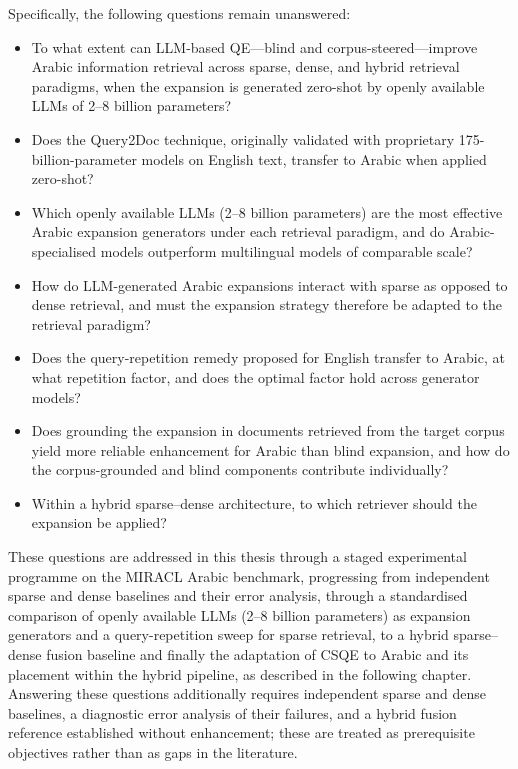 Specifically, the following questions remain unanswered:

\begin{itemize}
    \item To what extent can LLM-based QE---blind and corpus-steered---improve Arabic information retrieval across sparse, dense, and hybrid retrieval paradigms, when the expansion is generated zero-shot by openly available LLMs of 2--8 billion parameters?
    \item Does the Query2Doc technique, originally validated with proprietary 175-billion-parameter models on English text, transfer to Arabic when applied zero-shot?
    \item Which openly available LLMs (2--8 billion parameters) are the most effective Arabic expansion generators under each retrieval paradigm, and do Arabic-specialised models outperform multilingual models of comparable scale?
    \item How do LLM-generated Arabic expansions interact with sparse as opposed to dense retrieval, and must the expansion strategy therefore be adapted to the retrieval paradigm?
    \item Does the query-repetition remedy proposed for English transfer to Arabic, at what repetition factor, and does the optimal factor hold across generator models?
    \item Does grounding the expansion in documents retrieved from the target corpus yield more reliable enhancement for Arabic than blind expansion, and how do the corpus-grounded and blind components contribute individually?
    \item Within a hybrid sparse--dense architecture, to which retriever should the expansion be applied?
\end{itemize}

These questions are addressed in this thesis through a staged experimental programme on the MIRACL Arabic benchmark, progressing from independent sparse and dense baselines and their error analysis, through a standardised comparison of openly available LLMs (2--8 billion parameters) as expansion generators and a query-repetition sweep for sparse retrieval, to a hybrid sparse--dense fusion baseline and finally the adaptation of CSQE to Arabic and its placement within the hybrid pipeline, as described in the following chapter. Answering these questions additionally requires independent sparse and dense baselines, a diagnostic error analysis of their failures, and a hybrid fusion reference established without enhancement; these are treated as prerequisite objectives rather than as gaps in the literature.

